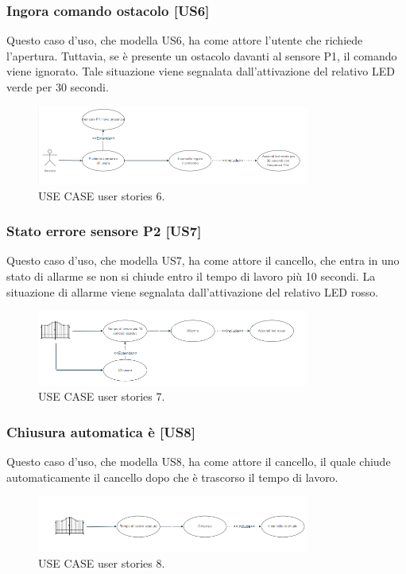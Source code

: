 \documentclass[12pt]{article}
\begin{document}
\subsubsection{Ingora comando ostacolo [US6]}
Questo caso d'uso, che modella US6, ha come attore l'utente che richiede l'apertura. Tuttavia, se è presente un ostacolo davanti al sensore P1, il comando viene ignorato. Tale situazione viene segnalata dall'attivazione del relativo LED verde per 30 secondi.
\begin{figure}[h]
    \centering
    \includegraphics[width=0.8\textwidth]{use_case_us6.PNG}
    \caption{USE CASE user stories 6.}
    \label{fig:use_case_us5}
\end{figure}
\newpage
\subsubsection{Stato errore sensore P2 [US7]}
Questo caso d'uso, che modella US7, ha come attore il cancello, che entra in uno stato di allarme se non si chiude entro il tempo di lavoro più 10 secondi. La situazione di allarme viene segnalata dall'attivazione del relativo LED rosso.
\begin{figure}[h]
    \centering
    \includegraphics[width=0.8\textwidth]{use_case_us7.PNG}
    \caption{USE CASE user stories 7.}
    \label{fig:use_case_us5}
\end{figure}
\subsubsection{Chiusura automatica è [US8]}
Questo caso d'uso, che modella US8, ha come attore il cancello, il quale chiude automaticamente il cancello dopo che è trascorso il tempo di lavoro.
\begin{figure}[h]
    \centering
    \includegraphics[width=0.8\textwidth]{use_case_us8.PNG}
    \caption{USE CASE user stories 8.}
    \label{fig:use_case_us5}
\end{figure}
\end{document}
